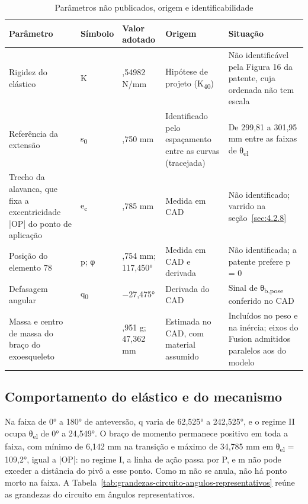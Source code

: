 \begin{table}[!htbp]
\estilotabela{\small}
\caption{Parâmetros não publicados, origem e identificabilidade}\label{tab:parametros-nao-publicados-origem-identificabilidade}
\begin{tabularx}{\textwidth}{@{}>{\hsize=1.229\hsize\raggedright\arraybackslash}X>{\hsize=0.566\hsize\centering\arraybackslash}X>{\hsize=0.801\hsize\centering\arraybackslash}X>{\hsize=1.068\hsize\raggedright\arraybackslash}X>{\hsize=1.335\hsize\raggedright\arraybackslash}X@{}}
\toprule
\centering\textbf{Parâmetro} & \centering\textbf{Símbolo} & \centering\textbf{Valor adotado} & \centering\textbf{Origem} & \centering\textbf{Situação} \tabularnewline
\midrule
Rigidez do elástico & K & 2,54982 N/mm & Hipótese de projeto (K\textsubscript{40}) & Não identificável pela Figura 16 da patente, cuja ordenada não tem escala \\
Referência da extensão & s\textsubscript{0} & 300,750 mm & Identificado pelo espaçamento entre as curvas (tracejada) & De 299,81 a 301,95 mm entre as faixas de θ\textsubscript{el} \\
Trecho da alavanca, que fixa a excentricidade |OP| do ponto de aplicação & e\textsubscript{c} & 34,785 mm & Medida em CAD & Não identificado; varrido na seção~\ref{sec:4.2.8} \\
Posição do elemento 78 & p; φ & 7,754 mm; 117,450° & Medida em CAD e derivada & Não identificada; a patente prefere p = 0 \\
Defasagem angular & q\textsubscript{0} & −27,475° & Derivada do CAD & Sinal de θ\textsubscript{b,pose} conferido no CAD \\
Massa e centro de massa do braço do exoesqueleto &  & 163,951 g; 47,362 mm & Estimada no CAD, com material assumido & Incluídos no peso e na inércia; eixos do Fusion admitidos paralelos aos do modelo \\
\bottomrule
\end{tabularx}
\end{table}

\subsection{Comportamento do elástico e do mecanismo}\label{sec:4.2.7}

Na faixa de 0° a 180° de anteversão, q varia de 62,525° a 242,525°, e o regime II ocupa θ\textsubscript{el} de 0° a 24,549°. O braço de momento permanece positivo em toda a faixa, com mínimo de 6,142 mm na transição e máximo de 34,785 mm em θ\textsubscript{el} = 109,2°, igual a |OP|: no regime I, a linha de ação passa por P, e m não pode exceder a distância do pivô a esse ponto. Como m não se anula, não há ponto morto na faixa. A Tabela~\ref{tab:grandezas-circuito-angulos-representativos} reúne as grandezas do circuito em ângulos representativos.

